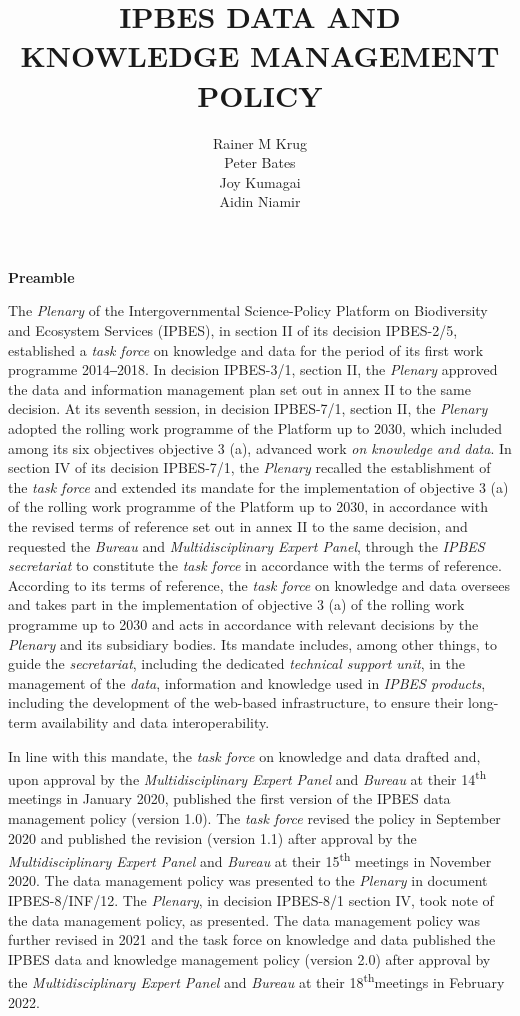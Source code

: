 \documentclass{article}
\title{IPBES DATA AND KNOWLEDGE MANAGEMENT POLICY}
\author{
    Rainer M Krug \\
    Peter Bates \\ 
    Joy Kumagai \\
    Aidin Niamir
}
\date{}
\begin{document}
\maketitle



\textbf{Preamble}

The \textit{Plenary }of the Intergovernmental Science-Policy Platform on Biodiversity and Ecosystem Services (IPBES), in section II of its decision IPBES-2/5, established a \textit{task force} on knowledge and data for the period of its first work programme 2014‒2018. In decision IPBES-3/1, section II, the \textit{Plenary} approved the data and information management plan set out in annex II to the same decision. At its seventh session, in decision IPBES-7/1, section II, the \textit{Plenary} adopted the rolling work programme of the Platform up to 2030, which included among its six objectives objective 3 (a), advanced work \textit{on knowledge and data}. In section IV of its decision IPBES-7/1, the \textit{Plenary }recalled the establishment of the \textit{task force} and extended its mandate for the implementation of objective 3 (a) of the rolling work programme of the Platform up to 2030, in accordance with the revised terms of reference set out in annex II to the same decision, and requested the \textit{Bureau} and \textit{Multidisciplinary Expert Panel}, through the \textit{IPBES secretariat} to constitute the \textit{task force} in accordance with the terms of reference. According to its terms of reference, the \textit{task force} on knowledge and data oversees and takes part in the implementation of objective 3 (a) of the rolling work programme up to 2030 and acts in accordance with relevant decisions by the \textit{Plenary} and its subsidiary bodies. Its mandate includes, among other things, to guide the \textit{secretariat}, including the dedicated \textit{technical support unit}, in the management of the \textit{data}, information and knowledge used in \textit{IPBES products}, including the development of the web-based infrastructure, to ensure their long-term availability and data interoperability.

In line with this mandate, the \textit{task force} on knowledge and data drafted and, upon approval by the \textit{Multidisciplinary Expert Panel} and \textit{Bureau} at their 14\textsuperscript{th} meetings in January 2020, published the first version of the IPBES data management policy (version 1.0). The \textit{task force }revised the policy in September 2020 and published the revision (version 1.1) after approval by the \textit{Multidisciplinary Expert Panel }and \textit{Bureau }at their 15\textsuperscript{th} meetings in November 2020. The data management policy was presented to the \textit{Plenary }in document IPBES-8/INF/12. The \textit{Plenary}, in decision IPBES-8/1 section IV, took note of the data management policy, as presented. The data management policy was further revised in 2021 and the task force on knowledge and data published the IPBES data and knowledge management policy (version 2.0) after approval by the \textit{Multidisciplinary Expert Panel }and \textit{Bureau }at their 18\textsuperscript{th}meetings in February 2022.
\end{document}
